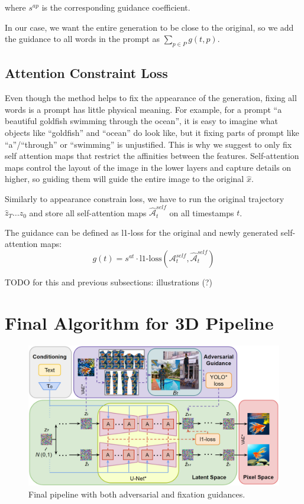 where $s^{ap}$ is the corresponding guidance coefficient.

In our case, we want the entire generation to be close to the original, so we add the guidance to all words in the prompt as $\sum_{p\in P} g(t,p)$.

\subsection{Attention Constraint Loss}

Even though the method helps to fix the appearance of the generation, fixing all words is a prompt has little physical meaning.
For example, for a prompt ``a beautiful goldfish swimming through the ocean'', it is easy to imagine what objects like ``goldfish'' and ``ocean'' do look like, but it fixing parts of prompt like ``a''/``through'' or ``swimming'' is unjustified.
This is why we suggest to only fix self attention maps that restrict the affinities between the features. 
Self-attention maps control the layout of the image in the lower layers and capture details on higher, so guiding them will guide the entire image to the original $\hat{x}$.

Similarly to appearance constrain loss, we have to run the original trajectory $\hat{z}_T\ldots\hat{z}_0$ and store all self-attention maps $\hat{\mathcal{A}}^{self}_t$ on all timestamps $t$.

The guidance can be defined as l1-loss for the original and newly generated self-attention maps:
$$g(t) = s^{at}\cdot \text{l1-loss}(\mathcal{A}^{self}_t, \hat{\mathcal{A}}^{self}_t)$$

TODO for this and previous subsections: illustrations (?)

\section{Final Algorithm for 3D Pipeline}

\begin{figure}[ht!]
\centering
\includegraphics[width=150mm]{figures/sd_adv_fix_3d.png}
\caption{Final pipeline with both adversarial and fixation guidances.}
\label{sd_3d_adv_fix}
\end{figure}

